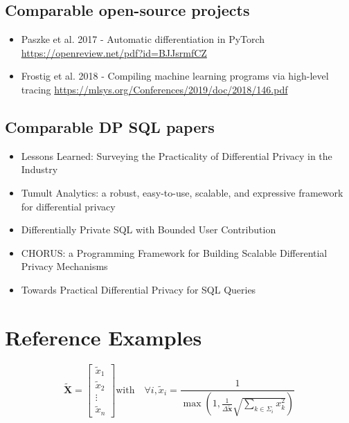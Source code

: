 \documentclass[letterpaper]{article} %
\begin{document}
\subsection{Comparable open-source projects}

\begin{itemize}
    \item Paszke et al. 2017 - Automatic differentiation in PyTorch \url{https://openreview.net/pdf?id=BJJsrmfCZ}
    \item Frostig et al. 2018 - Compiling machine learning programs via high-level tracing \url{https://mlsys.org/Conferences/2019/doc/2018/146.pdf}
\end{itemize}

\subsection{Comparable DP SQL papers}

\begin{itemize}
    \item Lessons Learned: Surveying the Practicality of Differential Privacy in the Industry \cite{garrido2022lessons}
    \item Tumult Analytics: a robust, easy-to-use, scalable, and expressive framework for differential privacy \cite{berghel2022tumult}
    \item Differentially Private SQL with Bounded User Contribution \cite{wilson2019differentially}
    \item CHORUS: a Programming Framework for Building Scalable Differential Privacy Mechanisms \cite{johnson2020chorus}
    \item Towards Practical Differential Privacy for SQL Queries \cite{johnson2018towards}
\end{itemize}

\appendix
\section{Reference Examples}
\label{sec:appendix_privacy_algos}


\begin{equation}
	\mathbf{\tilde{X}} = \begin{bmatrix}
		\tilde{x}_1 \\
		\tilde{x}_2 \\
		\vdots \\
		\tilde{x}_n
	\end{bmatrix}
	\text{with~~~}
	\forall i, \tilde{x}_i = \frac{1}{\max ( 1, \frac{1}{\Delta \tilde{\textbf{x}}} \sqrt{\sum_{k \in \Sigma_i} x_k^2})}
\end{equation}
\end{document}
